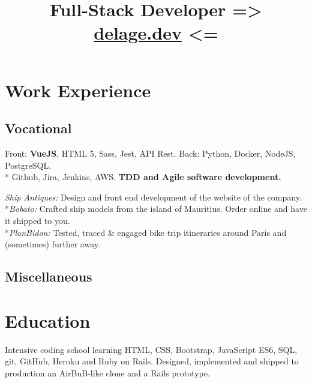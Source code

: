 \documentclass[11pt,a4paper,sans]{moderncv}
\title{Full-Stack Developer => \href{https://delage.dev/} {delage.dev} <=}
\begin{document}
\makecvtitle

\section{Work Experience}
\subsection{Vocational}

{{ Front: \textbf{VueJS}, HTML 5, Sass, Jest, API Rest. Back: Python, Docker, NodeJS, PostgreSQL. \\* Github, Jira, Jenkins, AWS. \textbf{TDD and Agile software development.}} \href{https://www.deepreach.com/} {}}

{{\textit{Ship Antiques:} Design and front end development of the website of the company. \href{https://shipantiques.herokuapp.com/}   {} }
\\*{\textit{Bobato:}  Crafted ship models from the island of Mauritius. Order online and have it shipped to you. \href{https://bobato-prk.herokuapp.com/}   {} }
\\*{\textit{PlanBidon:}  Tested, traced \& engaged bike trip itineraries around Paris and (sometimes) further away. \href{https://planbidon.herokuapp.com/}   {} }}


\subsection{Miscellaneous}

\section{Education}
{Intensive coding school learning HTML, CSS, Bootstrap, JavaScript ES6,
SQL, git, GitHub, Heroku and Ruby on Rails. Designed, implemented and shipped to
production an AirBnB-like clone and a Rails prototype.} 
\end{document}

